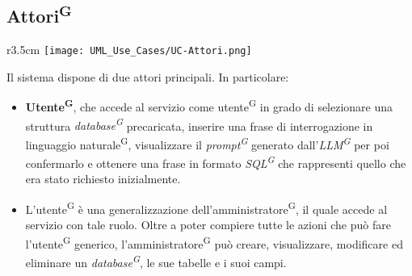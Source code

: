 \subsection{Attori\textsuperscript{G}}
\begin{wrapfigure}{r}{3.5cm}
	\texttt{[image: UML\_Use\_Cases/UC-Attori.png]}
\end{wrapfigure}
Il sistema dispone di due attori principali. In particolare:
\begin{itemize}
	\item \textbf{Utente\textsuperscript{G}}, che accede al servizio come utente\textsuperscript{G} in grado di selezionare una struttura \textit{database\textsuperscript{G}} precaricata, inserire una frase di interrogazione in linguaggio naturale\textsuperscript{G}, visualizzare il \textit{prompt\textsuperscript{G}} generato dall'\textit{LLM\textsuperscript{G}} per poi confermarlo e ottenere una frase in formato \textit{SQL\textsuperscript{G}} che rappresenti quello che era stato richiesto inizialmente.

	\item L'utente\textsuperscript{G} è una generalizzazione dell'amministratore\textsuperscript{G}, il quale accede al servizio con tale ruolo. Oltre a poter compiere tutte le azioni che può fare l'utente\textsuperscript{G} generico, l'amministratore\textsuperscript{G} può creare, visualizzare, modificare ed eliminare un \textit{database\textsuperscript{G}}, le sue tabelle e i suoi campi.
\end{itemize}

\setcounter{secnumdepth}{0}

